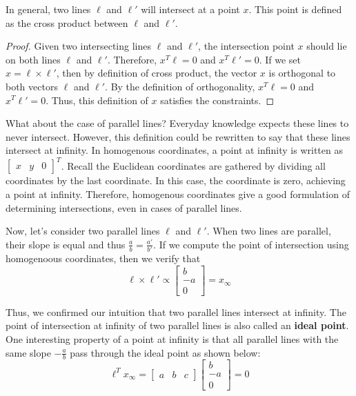 \documentclass[a4paper, 12pt]{article}
\renewcommand\emph{\textbf}
\begin{document}
In general, two lines $\ell$ and $\ell'$ will intersect at a point $x$. This point is defined as the cross product between $\ell$ and $\ell'$.

\begin{proof} 
    Given two intersecting lines $\ell$ and $\ell'$, the intersection point $x$ should lie on both lines $\ell$ and $\ell'$. Therefore, $x^T \ell = 0$ and $x^T\ell' = 0$. If we set $x = \ell \times \ell'$, then by definition of cross product, the vector $x$ is orthogonal to both vectors $\ell$ and $\ell'$. By the definition of orthogonality, $x^T \ell = 0$ and $x^T\ell' = 0$. Thus, this definition of $x$ satisfies the constraints. 
\end{proof}

What about the case of parallel lines? Everyday knowledge expects these lines to never intersect. However, this definition could be rewritten to say that these lines intersect at infinity. In homogenous coordinates, a point at infinity is written as $\begin{bmatrix}x & y & 0\end{bmatrix}^T$. Recall the Euclidean coordinates are gathered by dividing all coordinates by the last coordinate. In this case, the coordinate is zero, achieving a point at infinity. Therefore, homogenous coordinates give a good formulation of determining intersections, even in cases of parallel lines.

Now, let's consider two parallel lines $\ell$ and $\ell'$. When two lines are parallel, their slope is equal and thus $\frac{a}{b} = \frac{a'}{b'}$. If we compute the point of intersection using homogenoous coordinates, then we verify that
\begin{equation}
\ell \times \ell' \propto \begin{bmatrix}b \\ -a \\ 0  \end{bmatrix}= x_\infty
\end{equation}

Thus, we confirmed our intuition that two parallel lines intersect at infinity. The point of intersection at infinity of two parallel lines is also called an \emph{ideal point}. One interesting property of a point at infinity is that all parallel lines with the same slope $-\frac{a}{b}$ pass through the ideal point as shown below:
\begin{equation}
\ell ^T x_\infty = \begin{bmatrix}a & b & c\end{bmatrix} \begin{bmatrix}b \\ -a \\ 0\end{bmatrix} = 0
\end{equation}
\end{document}
